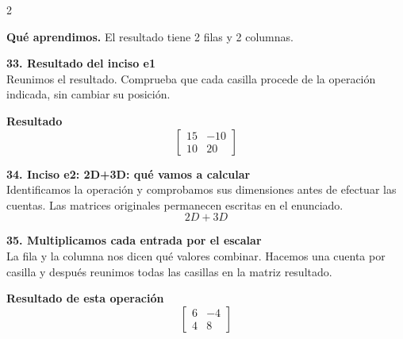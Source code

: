 \documentclass[11pt,a4paper,landscape]{article}
\begin{document}
\begin{multicols*}{2}
\begin{minipage}{\linewidth}
\par\smallskip\textbf{Qué aprendimos.} El resultado tiene 2 filas y 2 columnas.
\end{minipage}\par\medskip
\noindent\begin{minipage}{\linewidth}\textbf{33. Resultado del inciso e1}\\[2pt]Reunimos el resultado. Comprueba que cada casilla procede de la operación indicada, sin cambiar su posición.
\par\smallskip \textbf{Resultado}\[\begin{bmatrix}15 & -10\\10 & 20\end{bmatrix}\]
\end{minipage}\par\medskip
\noindent\begin{minipage}{\linewidth}\textbf{34. Inciso e2: 2D+3D: qué vamos a calcular}\\[2pt]Identificamos la operación y comprobamos sus dimensiones antes de efectuar las cuentas. Las matrices originales permanecen escritas en el enunciado.
\[2D+3D\]
\end{minipage}\par\medskip
\noindent\begin{minipage}{\linewidth}\textbf{35. Multiplicamos cada entrada por el escalar}\\[2pt]La fila y la columna nos dicen qué valores combinar. Hacemos una cuenta por casilla y después reunimos todas las casillas en la matriz resultado.
\par{}\par\smallskip
\par\smallskip \textbf{Resultado de esta operación}\[\begin{bmatrix}6 & -4\\4 & 8\end{bmatrix}\]

\end{minipage}
\end{multicols*}
\end{document}
